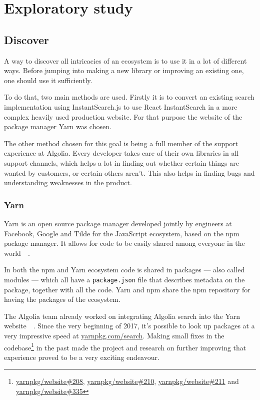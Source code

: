 
\chapter{Exploratory study} %
\label{chp:exploratory_study}

\section{Discover}
\label{sec:discovery}

A way to discover all intricacies of an ecosystem is to use it in a lot of different ways. Before jumping into making a new library or improving an existing one, one should use it sufficiently. 

To do that, two main methods are used. Firstly it is to convert an existing search implementation using InstantSearch.js\cite{instantsearch-js} to use React InstantSearch in a more complex heavily used production website. For that purpose the website of the package manager Yarn\cite{yarn-site} was chosen.

The other method chosen for this goal is being a full member of the support experience at Algolia. Every developer takes care of their own libraries in all support channels, which helps a lot in finding out whether certain things are wanted by customers, or certain others aren't. This also helps in finding bugs and understanding weaknesses in the product.

\subsection{Yarn} %
\label{ssec:yarn}

Yarn is an open source package manager developed jointly by engineers at Facebook, Google and Tilde for the JavaScript ecosystem, based on the npm package manager. It allows for code to be easily shared among everyone in the world~\cite{yarn-site}~.

In both the npm and Yarn ecosystem code is shared in packages --- also called modules --- which all have a {\tt package.json} file that describes metadata on the package, together with all the code. Yarn and npm share the npm repository for having the packages of the ecosystem.

The Algolia team already worked on integrating Algolia search into the Yarn website~\cite{yarn-pr-add-algolia}~. Since the very beginning of 2017, it’s possible to look up packages at a very impressive speed at \href{https://yarnpkg.com/search}{yarnpkg.com/search}. Making small fixes in the codebase\footnote{\href{https://github.com/yarnpkg/website/pulls/208}{yarnpkg/website\#208}, \href{https://github.com/yarnpkg/website/pulls/210}{yarnpkg/website\#210}, \href{https://github.com/yarnpkg/website/pulls211}{yarnpkg/website\#211} and \href{https://github.com/yarnpkg/website/pulls/335}{yarnpkg/website\#335}} in the past made the project and research on further improving that experience proved to be a very exciting endeavour.

